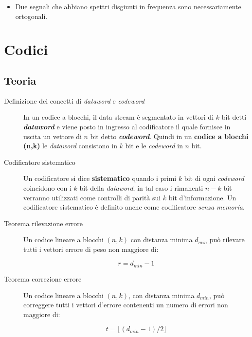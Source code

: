 \documentclass[10pt,a4paper]{article}
\begin{document}
\begin{itemize}
\item Due segnali che abbiano spettri disgiunti in frequenza sono necessariamente ortogonali.
\end{itemize}


\newpage
\section{Codici}

\subsection{Teoria}

\begin{description}
\item[Definizione dei concetti di \textit{dataword} e \textit{codeword}] In un codice a blocchi, il data stream è segmentato in vettori di $k$ bit detti \textbf{\textit{dataword}} e viene posto in ingresso al codificatore il quale fornisce in uscita un vettore di $n$ bit detto \textbf{\textit{codeword}}. Quindi in un \textbf{codice a blocchi (n,k)} le \textit{dataword} consistono in $k$ bit e le \textit{codeword} in $n$ bit.

\item[Codificatore sistematico] Un codificatore si dice \textbf{sistematico} quando i primi $k$ bit di ogni \textit{codeword} coincidono con i $k$ bit della \textit{dataword}; in tal caso i rimanenti $n-k$ bit verranno utilizzati come controlli di parità sui $k$ bit d'informazione. Un codificatore sistematico è definito anche come codificatore \textit{senza memoria}.

\item[Teorema rilevazione errore] Un codice lineare a blocchi $(n,k)$ con distanza minima $d_{min}$  può rilevare tutti i vettori errore di peso non maggiore di:

\begin{equation}
r = d_{min}-1
\end{equation}

\item[Teorema correzione errore] Un codice lineare a blocchi $(n,k)$, con distanza minima $d_{min}$, può correggere tutti i vettori d'errore contenenti un numero di errori non maggiore di:

\begin{equation}
t = \lfloor (d_{min} - 1) / 2 \rfloor	
\end{equation}


\end{description}
\end{document}
